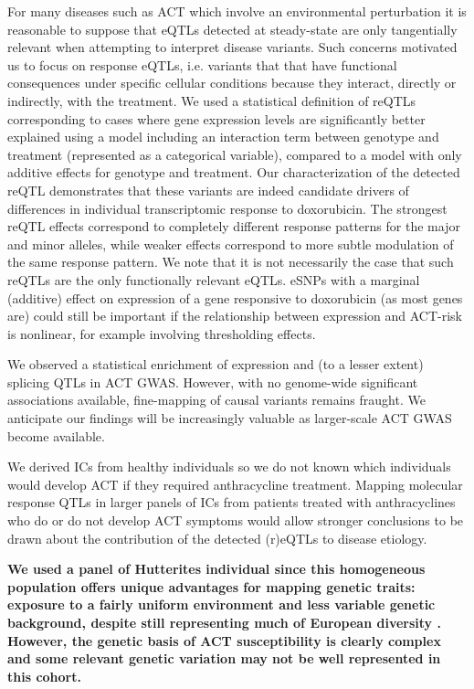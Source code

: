\documentclass[9pt,lineno]{elife}
\newcommand{\tempbold}[1]{\textbf{#1}}
\begin{document}
For many diseases such as ACT which involve an environmental perturbation it is reasonable to suppose that eQTLs detected at steady-state are only tangentially relevant when attempting to interpret disease variants.
Such concerns motivated us to focus on response eQTLs, i.e. variants that that have functional consequences under specific cellular conditions because they interact, directly or indirectly, with the treatment.
We used a statistical definition of reQTLs corresponding to cases where gene expression levels are significantly better explained using a model including an interaction term between genotype and treatment (represented as a categorical variable), compared to a model with only additive effects for genotype and treatment. 
Our characterization of the detected reQTL demonstrates that these variants are indeed candidate drivers of differences in individual transcriptomic response to doxorubicin. The strongest reQTL effects correspond to completely different response patterns for the major and minor alleles, while weaker effects correspond to more subtle modulation of the same response pattern. 
We note that it is not necessarily the case that such reQTLs are the only functionally relevant eQTLs. eSNPs with a marginal (additive) effect on expression of a gene responsive to doxorubicin (as most genes are) could still be important if the relationship between expression and ACT-risk is nonlinear, for example involving thresholding effects. 

We observed a statistical enrichment of expression and (to a lesser extent) splicing QTLs in ACT GWAS. However, with no genome-wide significant associations available, fine-mapping of causal variants remains fraught. We anticipate our findings will be increasingly valuable as larger-scale ACT GWAS become available. 

We derived ICs from healthy individuals so we do not known which individuals would develop ACT if they required anthracycline treatment. Mapping molecular response QTLs in larger panels of ICs from patients treated with anthracyclines who do or do not develop ACT symptoms would allow stronger conclusions to be drawn about the contribution of the detected (r)eQTLs to disease etiology. 

\tempbold{We used a panel of Hutterites individual since this homogeneous population offers unique advantages for mapping genetic traits: exposure to a fairly uniform environment and less variable genetic background, despite still representing much of European diversity \citep{Newman2004-ms}. However, the genetic basis of ACT susceptibility is clearly complex and some relevant genetic variation may not be well represented in this cohort.}
\end{document}

